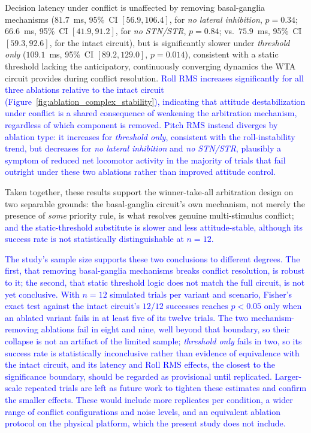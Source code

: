 \documentclass[preprint,12pt]{elsarticle}
\newcommand{\revblue}[1]{\textcolor{blue}{#1}}
\begin{document}
Decision latency under conflict is unaffected by removing basal-ganglia mechanisms ($81.7$~ms, 95\%~CI $[56.9, 106.4]$, for \emph{no lateral inhibition}, $p=0.34$; $66.6$~ms, 95\%~CI $[41.9, 91.2]$, for \emph{no STN/STR}, $p=0.84$; vs.\ $75.9$~ms, 95\%~CI $[59.3, 92.6]$, for the intact circuit), but is significantly slower under \emph{threshold only} ($109.1$~ms, 95\%~CI $[89.2, 129.0]$, $p=0.014$), consistent with a static threshold lacking the anticipatory, continuously converging dynamics the WTA circuit provides during conflict resolution. \revblue{Roll RMS increases significantly for all three ablations relative to the intact circuit (Figure~\ref{fig:ablation_complex_stability}), indicating that attitude destabilization under conflict is a shared consequence of weakening the arbitration mechanism, regardless of which component is removed. Pitch RMS instead diverges by ablation type: it increases for \emph{threshold only}, consistent with the roll-instability trend, but decreases for \emph{no lateral inhibition} and \emph{no STN/STR}, plausibly a symptom of reduced net locomotor activity in the majority of trials that fail outright under these two ablations rather than improved attitude control.}

Taken together, these results support the winner-take-all arbitration design on two separable grounds: the basal-ganglia circuit's own mechanism, not merely the presence of \emph{some} priority rule, is what resolves genuine multi-stimulus conflict; \revblue{and the static-threshold substitute is slower and less attitude-stable, although its success rate is not statistically distinguishable at $n=12$.}

\revblue{The study's sample size supports these two conclusions to different degrees. The first, that removing basal-ganglia mechanisms breaks conflict resolution, is robust to it; the second, that static threshold logic does not match the full circuit, is not yet conclusive. With $n=12$ simulated trials per variant and scenario, Fisher's exact test against the intact circuit's $12/12$ successes reaches $p<0.05$ only when an ablated variant fails in at least five of its twelve trials. The two mechanism-removing ablations fail in eight and nine, well beyond that boundary, so their collapse is not an artifact of the limited sample; \emph{threshold only} fails in two, so its success rate is statistically inconclusive rather than evidence of equivalence with the intact circuit, and its latency and Roll RMS effects, the closest to the significance boundary, should be regarded as provisional until replicated. Larger-scale repeated trials are left as future work to tighten these estimates and confirm the smaller effects. These would include more replicates per condition, a wider range of conflict configurations and noise levels, and an equivalent ablation protocol on the physical platform, which the present study does not include.}
\end{document}
